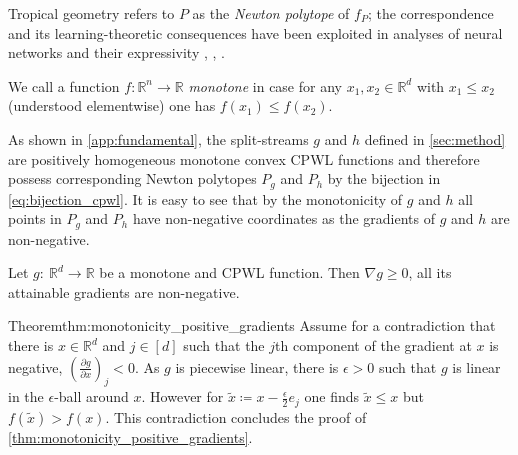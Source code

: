Tropical geometry refers to $P$ as the \emph{Newton polytope} of $f_P$; the correspondence and its learning-theoretic consequences have been exploited in analyses of neural networks and their expressivity , , .

We call a function $f:\mathbb{R}^n \to \mathbb{R}$ \emph{monotone} in case for any $x_1, x_2 \in \mathbb{R}^d$ with $x_1 \leq x_2$ (understood elementwise) one has $f(x_1) \leq f(x_2)$.

As shown in \cref{app:fundamental}, the split-streams $g$ and $h$ defined in \cref{sec:method} are positively homogeneous monotone convex CPWL functions and therefore possess corresponding Newton polytopes $P_g$ and $P_h$ by the bijection in \cref{eq:bijection_cpwl}.
It is easy to see that by the monotonicity of $g$ and $h$ all points in $P_g$ and $P_h$ have non-negative coordinates as the gradients of $g$ and $h$ are non-negative.
\begin{theorem} \label{thm:monotonicity_positive_gradients}
    Let $g: \ \mathbb{R}^{d} \longrightarrow \mathbb{R}$ be a monotone and CPWL function. Then $\nabla g \geq 0$, \ie all its attainable gradients are non-negative.
\end{theorem}

\begin{proofref}{Theorem}{thm:monotonicity_positive_gradients}
    Assume for a contradiction that there is $x \in \mathbb{R}^d$ and $j \in [d]$ such that the $j$th component of the gradient at $x$ is negative, \ie $\left( \frac{\partial g}{\partial x} \right)_j < 0$.
    As $g$ is piecewise linear, there is $\epsilon > 0$ such that $g$ is linear in the $\epsilon$-ball around $x$. However for $\tilde{x} \coloneqq x - \frac{\epsilon}{2} e_j$ one finds $\tilde{x} \leq x$ but $f\left( \tilde{x} \right) > f(x)$. This contradiction concludes the proof of \cref{thm:monotonicity_positive_gradients}.
\end{proofref}

